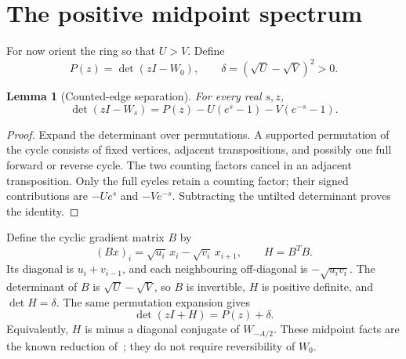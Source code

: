 \documentclass[11pt,a4paper]{article}
\numberwithin{equation}{section}
\newtheorem{lemma}[theorem]{Lemma}
\theoremstyle{remark}
\newcommand{\Id}{I}
\begin{document}
\section{The positive midpoint spectrum}\label{sec:spectrum}

For now orient the ring so that $U>V$. Define
\begin{equation}\label{eq:Pdelta}
  P(z)=\det(z\Id-W_0),\qquad
  \delta=(\sqrt U-\sqrt V)^2>0.
\end{equation}

\begin{lemma}[Counted-edge separation]\label{lem:det}
For every real $s,z$,
\begin{equation}\label{eq:tiltdet}
  \det(z\Id-W_s)=P(z)-U(e^s-1)-V(e^{-s}-1).
\end{equation}
\end{lemma}
\begin{proof}
Expand the determinant over permutations. A supported permutation of the
cycle consists of fixed vertices, adjacent transpositions, and possibly
one full forward or reverse cycle. The two counting factors cancel in an
adjacent transposition. Only the full cycles retain a counting factor;
their signed contributions are $-Ue^s$ and $-Ve^{-s}$. Subtracting the
untilted determinant proves the identity.
\end{proof}

Define the cyclic gradient matrix $B$ by
\begin{equation}\label{eq:gram}
  (Bx)_i=\sqrt{u_i}\,x_i-\sqrt{v_i}\,x_{i+1},\qquad H=B^TB.
\end{equation}
Its diagonal is $u_i+v_{i-1}$, and each neighbouring off-diagonal is
$-\sqrt{u_iv_i}$. The determinant of $B$ is $\sqrt U-\sqrt V$, so $B$ is
invertible, $H$ is positive definite, and $\det H=\delta$. The same
permutation expansion gives
\begin{equation}\label{eq:spectralshift}
  \det(z\Id+H)=P(z)+\delta.
\end{equation}
Equivalently, $H$ is minus a diagonal conjugate of $W_{-A/2}$.
These midpoint facts are the known reduction of~\cite[Appendix C]{Pietzonka2016};
they do not require reversibility of $W_0$.
\end{document}
